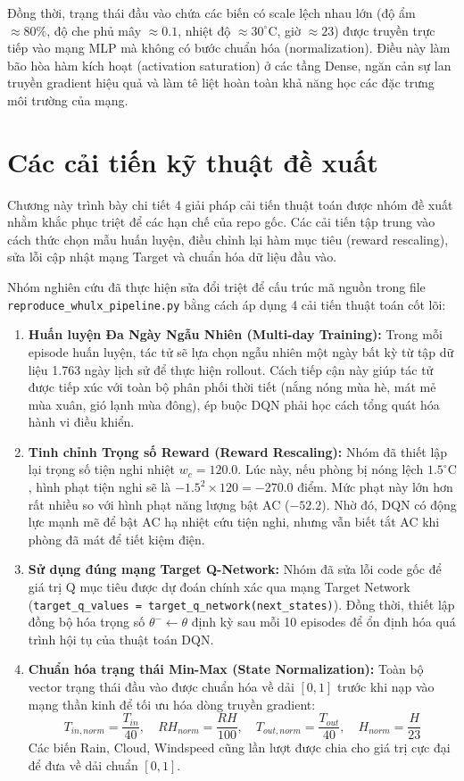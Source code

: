 \documentclass[12pt, a4paper]{article}
\begin{document}
Đồng thời, trạng thái đầu vào chứa các biến có scale lệch nhau lớn (độ ẩm $\approx 80\%$, độ che phủ mây $\approx 0.1$, nhiệt độ $\approx 30^\circ\text{C}$, giờ $\approx 23$) được truyền trực tiếp vào mạng MLP mà không có bước chuẩn hóa (normalization). Điều này làm bão hòa hàm kích hoạt (activation saturation) ở các tầng Dense, ngăn cản sự lan truyền gradient hiệu quả và làm tê liệt hoàn toàn khả năng học các đặc trưng môi trường của mạng.

\section{Các cải tiến kỹ thuật đề xuất}
Chương này trình bày chi tiết 4 giải pháp cải tiến thuật toán được nhóm đề xuất nhằm khắc phục triệt để các hạn chế của repo gốc. Các cải tiến tập trung vào cách thức chọn mẫu huấn luyện, điều chỉnh lại hàm mục tiêu (reward rescaling), sửa lỗi cập nhật mạng Target và chuẩn hóa dữ liệu đầu vào.

Nhóm nghiên cứu đã thực hiện sửa đổi triệt để cấu trúc mã nguồn trong file \texttt{reproduce\_whulx\_pipeline.py} bằng cách áp dụng 4 cải tiến thuật toán cốt lõi:

\begin{enumerate}
    \item \textbf{Huấn luyện Đa Ngày Ngẫu Nhiên (Multi-day Training):} Trong mỗi episode huấn luyện, tác tử sẽ lựa chọn ngẫu nhiên một ngày bất kỳ từ tập dữ liệu 1.763 ngày lịch sử để thực hiện rollout. Cách tiếp cận này giúp tác tử được tiếp xúc với toàn bộ phân phối thời tiết (nắng nóng mùa hè, mát mẻ mùa xuân, gió lạnh mùa đông), ép buộc DQN phải học cách tổng quát hóa hành vi điều khiển.
    \item \textbf{Tinh chỉnh Trọng số Reward (Reward Rescaling):} Nhóm đã thiết lập lại trọng số tiện nghi nhiệt $w_c = 120.0$. Lúc này, nếu phòng bị nóng lệch $1.5^\circ\text{C}$, hình phạt tiện nghi sẽ là $-1.5^2 \times 120 = -270.0$ điểm. Mức phạt này lớn hơn rất nhiều so với hình phạt năng lượng bật AC ($-52.2$). Nhờ đó, DQN có động lực mạnh mẽ để bật AC hạ nhiệt cứu tiện nghi, nhưng vẫn biết tắt AC khi phòng đã mát để tiết kiệm điện.
    \item \textbf{Sử dụng đúng mạng Target Q-Network:} Nhóm đã sửa lỗi code gốc để giá trị Q mục tiêu được dự đoán chính xác qua mạng Target Network (\texttt{target\_q\_values = target\_q\_network(next\_states)}). Đồng thời, thiết lập đồng bộ hóa trọng số $\theta^- \leftarrow \theta$ định kỳ sau mỗi 10 episodes để ổn định hóa quá trình hội tụ của thuật toán DQN.
    \item \textbf{Chuẩn hóa trạng thái Min-Max (State Normalization):} Toàn bộ vector trạng thái đầu vào được chuẩn hóa về dải $[0, 1]$ trước khi nạp vào mạng thần kinh để tối ưu hóa dòng truyền gradient:
    \begin{equation}
    T_{in, norm} = \frac{T_{in}}{40}, \quad RH_{norm} = \frac{RH}{100}, \quad T_{out, norm} = \frac{T_{out}}{40}, \quad H_{norm} = \frac{H}{23}
    \end{equation}
    Các biến Rain, Cloud, Windspeed cũng lần lượt được chia cho giá trị cực đại để đưa về dải chuẩn $[0, 1]$.
\end{enumerate}
\end{document}
